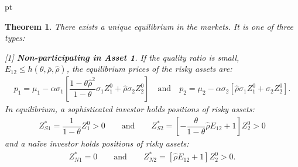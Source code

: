 \documentclass[10pt]{article}
\newtheorem{thm}{Theorem}
\begin{document}
 pt

\begin{thm}
There exists a unique equilibrium in the markets. It is one of three types:

[1] {\bf Non-participating in Asset 1}. If the quality ratio is small, $ E_{1 2} \leqslant h (\theta, \overline{\rho}, {\hat \rho}) $, the equilibrium prices of the risky assets are:
\begin{eqnarray*}
p_1 = \mu_1 - \alpha \sigma_1 \left[ \dfrac{1 - \theta {\hat \rho}^2}{1 - \theta} \sigma_1 Z_1^0 + {\hat \rho} \sigma_2 Z_2^0 \right] \quad \text{and} \quad p_2 = \mu_2 - \alpha \sigma_2 \left[ {\hat \rho} \sigma_1 Z_1^0 + \sigma_2 Z_2^0 \right].
\end{eqnarray*}
In equilibrium, a sophisticated investor holds positions of risky assets:
\begin{eqnarray*}
Z_{S 1}^* = \dfrac{1}{1 - \theta} Z_1^0 > 0 \qquad \text{and} \qquad Z_{S 2}^* = \left[ - \dfrac{\theta}{1 - \theta} {\hat \rho} E_{1 2} + 1 \right] Z_2^0 > 0
\end{eqnarray*}
and a na\"ive investor holds positions of risky assets:
\begin{eqnarray*}
Z_{N 1}^* = 0 \qquad \text{and} \qquad Z_{N 2}^* = \left[ {\hat \rho} E_{1 2} + 1 \right] Z_2^0 > 0.
\end{eqnarray*}


\end{thm}
\end{document}
